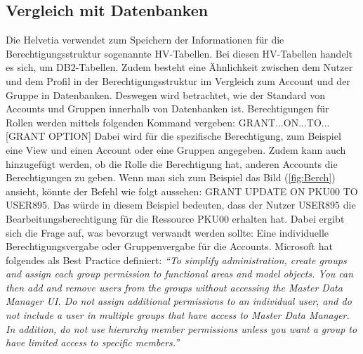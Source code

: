 \subsection{Vergleich mit Datenbanken}
\label{sec:chapter04:DB}
Die Helvetia verwendet zum Speichern der Informationen für die Berechtigungsstruktur sogenannte HV-Tabellen.
Bei diesen HV-Tabellen handelt es sich, um DB$2$-Tabellen.
Zudem besteht eine Ähnlichkeit zwischen dem Nutzer und dem Profil in der Berechtigungsstruktur im Vergleich zum Account und der Gruppe in Datenbanken.
Deswegen wird betrachtet, wie der Standard von Accounts und Gruppen innerhalb von Datenbanken ist.
\newline
Berechtigungen für Rollen werden mittels folgenden Kommand vergeben: 
\newline
\newline
GRANT...ON...TO...[GRANT OPTION]
\newline
\newline
Dabei wird für die spezifische Berechtigung, zum Beispiel eine View und einen Account oder eine Gruppen angegeben.
Zudem kann auch hinzugefügt werden, ob die Rolle die Berechtigung hat, anderen Accounts die Berechtigungen zu geben.\cite[474-475]{Ram09}
\newline
Wenn man sich zum Beispiel das Bild (\ref{fig:Berch}) ansieht, könnte der Befehl wie folgt aussehen:
\newline
\newline
GRANT UPDATE ON PKU$00$ TO USER$895$.
\newline
\newline
Das würde in diesem Beispiel bedeuten, dass der Nutzer USER$895$ die Bearbeitungsberechtigung für die Ressource PKU00 erhalten hat.
Dabei ergibt sich die Frage auf, was bevorzugt verwandt werden sollte:
\newline
Eine individuelle Berechtigungsvergabe oder Gruppenvergabe für die Accounts.
Microsoft hat folgendes als Best Practice definiert:
\newline
\newline
\textit{"`To simplify administration, create groups and assign each group permission to functional areas and model objects.
You can then add and remove users from the groups without accessing the Master Data Manager UI.
\newline
\newline
Do not assign additional permissions to an individual user, and do not include a user in multiple groups that have access to Master Data Manager. In addition, do not use hierarchy member permissions unless you want a group to have limited access to specific members."'} \cite{Micro}

